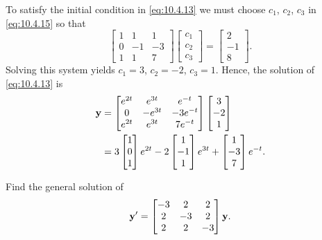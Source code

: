 \begin{alistSolution}
\item
 To satisfy the initial condition in  \eqref{eq:10.4.13} we must choose
$c_1$, $c_2$, $c_3$ in  \eqref{eq:10.4.15} so that
\[
\begin{bmatrix}1&1&1\\0&-1&-3\\1&1&7\end{bmatrix}
\begin{bmatrix}c_1\\c_2\\c_3\end{bmatrix}=
\begin{bmatrix}2\\-1\\8\end{bmatrix}.
\]
Solving this system yields $c_1=3$, $c_2=-2$, $c_3=1$.  Hence, the solution
of  \eqref{eq:10.4.13} is
\begin{align*}
\mathbf{y}&=\begin{bmatrix}
e^{2t}&e^{3t}&e^{-t}\\
0&-e^{3t}&-3e^{-t}\\
e^{2t}&e^{3t}&7e^{-t}
\end{bmatrix}
\begin{bmatrix}3\\-2\\1\end{bmatrix}\\
&=3\begin{bmatrix}1\\0\\1\end{bmatrix}e^{2t}
-2\begin{bmatrix}1\\-1\\1\end{bmatrix}e^{3t}
+\begin{bmatrix}1\\-3\\7\end{bmatrix}e^{-t}.
\end{align*}
\end{alistSolution}

\begin{example}\label{example:10.4.3}
 Find the general solution of
\begin{equation}\label{eq:10.4.16}
\mathbf{y}'=\begin{bmatrix}-3&2&2\\2&-3&2\\2&2&-3\end{bmatrix}\mathbf{y}.
\end{equation}
\end{example}

